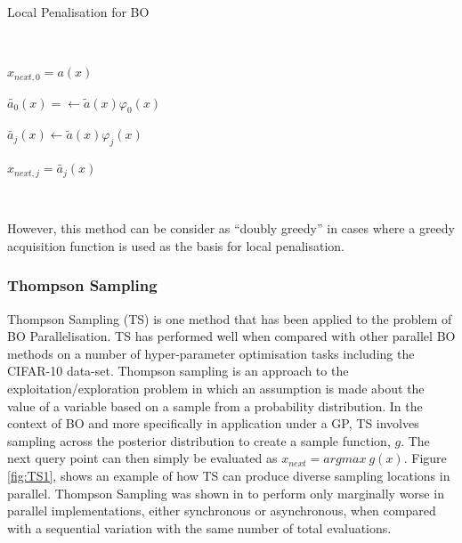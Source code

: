 \documentclass{article}
\begin{document}
			\begin{algorithm}[H]\label{alg:LP1}
			\caption{Local Penalisation for BO}
			\SetAlgoLined
			\
			\

		  	\(x_{next,0} = a(x)\)\;

		  	\(\widetilde{a_0}(x) = \leftarrow \widetilde{a}(x)\varphi_{0}(x)\)\;


			{
				\(\widetilde{a_j}(x) \leftarrow \widetilde{a}(x)\varphi_{j}(x)\)\;

			  	\(x_{next,j} = \widetilde{a_j}(x)\)\;

			}

			
			\end{algorithm}

			\par \(~\)

			However, this method can be consider as “doubly greedy” \cite{36} in cases where a greedy acquisition function is used as the basis for local penalisation.




		\subsubsection{Thompson Sampling}

			Thompson Sampling (TS) is one method that has been applied to the problem of BO Parallelisation\cite{26}\cite{27}. TS has performed well when compared with other parallel BO methods on a number of hyper-parameter optimisation tasks including the CIFAR-10 data-set. 
			Thompson sampling is an approach to the exploitation/exploration problem in which an assumption is made about the value of a variable based on a sample from a probability distribution. In the context of BO and more specifically in application under a GP, TS involves sampling across the posterior distribution to create a sample function, \(g\). The next query point can then simply be evaluated as \(x_{next} = argmax ~g(x)\). Figure \ref{fig:TS1}, shows an example of how TS can produce diverse sampling locations in parallel. Thompson Sampling was shown in \cite{27} to perform only marginally worse in parallel implementations, either synchronous or asynchronous, when compared with a sequential variation with the same number of total evaluations.
\end{document}
